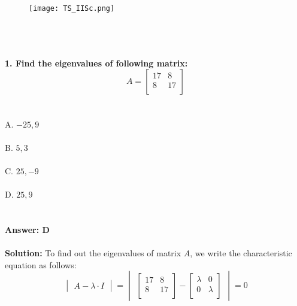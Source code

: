 \documentclass[prl,twocolumn,showpacs,preprintnumbers,superscriptaddress]{revtex4}
\theoremstyle{plain}
\theoremstyle{definition}
\begin{document}
\begin{widetext}
\\
\\
\\
\\

\begin{wrapfigure}
\centering
\end{wrapfigure}
\begin{figure}[h!]
 \begin{right}
  \hfill\texttt{[image: TS\_IISc.png]}
 \end{right}
\end{figure}
\\
\\
\\
{\Large
\noindent\textbf{1. Find the eigenvalues of following matrix:}
\[
A = \begin{bmatrix}    17 & 8  \\     8 & 17    \\ \end{bmatrix}
\]
\\
\\
A. $-25, 9$\\
\\
B. $5, 3$\\
\\
C. $25, -9$\\
\\
D. $25, 9$
\\
\\
\\
\textbf{Answer: D}
\\
\\
\textbf{Solution:}
To find out the eigenvalues of matrix $A$, we write the characteristic equation as follows:
%
\[
\begin{vmatrix}    A - \lambda \cdot I \end{vmatrix} = \begin{vmatrix} \begin{bmatrix}    17 & 8 \\     8 & 17   \\ \end{bmatrix} - \begin{bmatrix}    \lambda & 0 \\     0 & \lambda  \\ \end{bmatrix}\end{vmatrix} = 0
\]
\\
}
\end{widetext}
\end{document}

